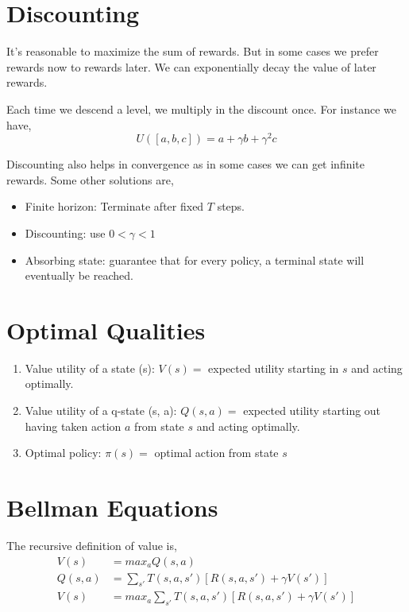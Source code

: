 \section{Discounting}
It's reasonable to maximize the sum of rewards. But in some cases we prefer rewards now to rewards later. We can exponentially decay the value of later rewards. 

\vspace{1em}

Each time we descend a level, we multiply in the discount once. For instance we have, 
$$ U([a,b,c]) = a + \gamma b + \gamma^2 c $$ 

Discounting also helps in convergence as in some cases we can get infinite rewards. Some other solutions are, 
\begin{itemize}
    \item Finite horizon: Terminate after fixed $T$ steps.
    \item Discounting: use $0 < \gamma < 1$
    \item Absorbing state: guarantee that for every policy, a terminal state will eventually be reached.
\end{itemize}       



\section{Optimal Qualities}
\begin{enumerate}
    \item Value utility of a state (s): $V(s)=$ expected utility starting in  $s$ and acting optimally.
    \item Value utility of a q-state (s, a): $Q(s,a)=$ expected utility starting out having taken action  $a$ from state $s$ and acting optimally.
    \item Optimal policy: $\pi(s) = $ optimal action from state  $s$
\end{enumerate}

\section{Bellman Equations}
The recursive definition of value is, 
\begin{align*}
    V(s) &= max_a Q(s, a)\\
    Q(s, a) &= \sum_{s'} T(s, a, s') [R(s, a, s') + \gamma V(s')]\\
    V(s) &= max_a \sum_{s'} T(s, a, s') [R(s, a, s') + \gamma V(s')]
\end{align*}

